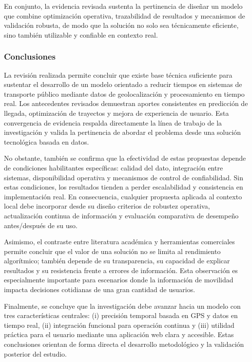 En conjunto, la evidencia revisada sustenta la pertinencia de diseñar un modelo que combine optimización operativa, trazabilidad de resultados y mecanismos de validación robusta, de modo que la solución no solo sea técnicamente eficiente, sino también utilizable y confiable en contexto real.

\subsubsection{Conclusiones}

La revisión realizada permite concluir que existe base técnica suficiente para sustentar el desarrollo de un modelo orientado a reducir tiempos en sistemas de transporte público mediante datos de geolocalización y procesamiento en tiempo real. Los antecedentes revisados demuestran aportes consistentes en predicción de llegada, optimización de trayectos y mejora de experiencia de usuario. Esta convergencia de evidencia respalda directamente la línea de trabajo de la investigación y valida la pertinencia de abordar el problema desde una solución tecnológica basada en datos.

No obstante, también se confirma que la efectividad de estas propuestas depende de condiciones habilitantes específicas: calidad del dato, integración entre sistemas, disponibilidad operativa y mecanismos de control de confiabilidad. Sin estas condiciones, los resultados tienden a perder escalabilidad y consistencia en implementación real. En consecuencia, cualquier propuesta aplicada al contexto local debe incorporar desde su diseño criterios de robustez operativa, actualización continua de información y evaluación comparativa de desempeño antes/después de su uso.

Asimismo, el contraste entre literatura académica y herramientas comerciales permite concluir que el valor de una solución no se limita al rendimiento algorítmico; también depende de su transparencia, su capacidad de explicar resultados y su resistencia frente a errores de información. Esta observación es especialmente importante para escenarios donde la información de movilidad impacta decisiones cotidianas de una gran cantidad de usuarios.

Finalmente, se concluye que la investigación debe avanzar hacia un modelo con tres características centrales: (i) precisión temporal basada en GPS y datos en tiempo real, (ii) integración funcional para operación continua y (iii) utilidad práctica para el usuario mediante una aplicación web clara y accesible. Estas conclusiones orientan de forma directa el desarrollo metodológico y la validación posterior del estudio.

